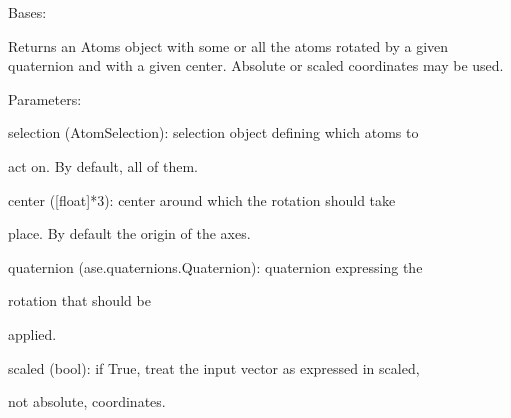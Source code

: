 \documentclass[letterpaper,10pt,english]{sphinxmanual}
\begin{document}

\begin{fulllineitems}
\label{doctree/soprano.properties.transform.transform:soprano.properties.transform.transform.Rotate}
Bases: {\hyperref[doctree/soprano.properties.atomsproperty:soprano.properties.atomsproperty.AtomsProperty]{\emph{}}}

Returns an Atoms object with some or all the atoms rotated by a given
quaternion and with a given center. Absolute or scaled coordinates may be
used.

\begin{DUlineblock}{0em}
\item[] Parameters:
\item[]
\begin{DUlineblock}{\DUlineblockindent}
\item[] selection (AtomSelection): selection object defining which atoms to
\item[]
\begin{DUlineblock}{\DUlineblockindent}
\item[] act on. By default, all of them.
\end{DUlineblock}
\item[] center ({[}float{]}*3): center around which the rotation should take
\item[]
\begin{DUlineblock}{\DUlineblockindent}
\item[] place. By default the origin of the axes.
\end{DUlineblock}
\item[] quaternion (ase.quaternions.Quaternion): quaternion expressing the
\item[]
\begin{DUlineblock}{\DUlineblockindent}
\item[] rotation that should be
\item[] applied.
\end{DUlineblock}
\item[] scaled (bool): if True, treat the input vector as expressed in scaled,
\item[]
\begin{DUlineblock}{\DUlineblockindent}
\item[] not absolute, coordinates.
\end{DUlineblock}
\end{DUlineblock}
\end{DUlineblock}


\end{fulllineitems}
\end{document}
